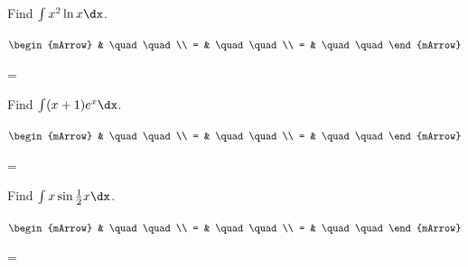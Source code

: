 \clearpage\noindent%
\begin{mtask}[resume]
		 
   \task \begin{exercise} Find $\int x^2 \ln x \dx$.
           \begin{envSolution}
             $\begin{mArrow}
                   & \quad \quad              \\
		   		 = & \quad \quad              \\
				 = & \quad \quad 
              \end{mArrow}$
            \begin{shortsolution}  
			     =$ \quad \quad \quad \quad$
			\end{shortsolution}				 
           \end{envSolution}
         \end{exercise}
\end{mtask}

\clearpage\noindent%
\begin{mtask}[resume]
   \task \begin{exercise} Find $\int (x+1) e^x \dx$.
           \begin{envSolution}[height=10cm]
             $\begin{mArrow}
                   & \quad \quad              \\
		   		 = & \quad \quad              \\
				 = & \quad \quad 
              \end{mArrow}$
            \begin{shortsolution}  
			     =$ \quad \quad \quad \quad$
			\end{shortsolution}				 
           \end{envSolution}
         \end{exercise}
   \task \begin{exercise} Find $\int x \sin{\frac{1}{2}x} \dx$.
           \begin{envSolution}[height=10cm]
             $\begin{mArrow}
                   & \quad \quad              \\
		   		 = & \quad \quad              \\
				 = & \quad \quad 
              \end{mArrow}$
            \begin{shortsolution}  
			     =$ \quad \quad \quad \quad$
			\end{shortsolution}				 
           \end{envSolution}
         \end{exercise}
\end{mtask}

